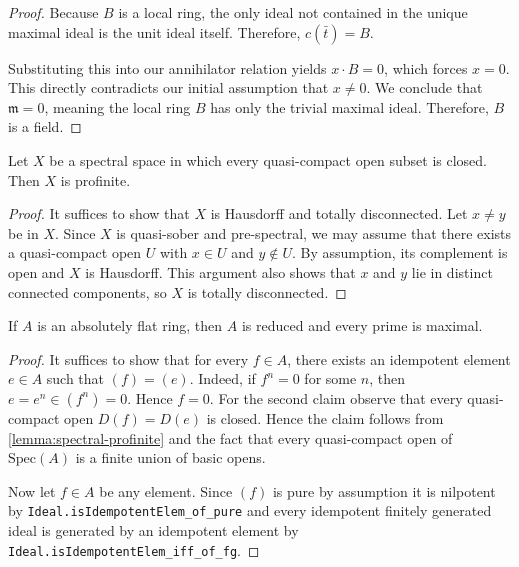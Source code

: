 \begin{proof}
    Because $B$ is a local ring, the only ideal not contained in the unique maximal ideal is the unit ideal itself. Therefore, $c(\bar{t}) = B$.

    Substituting this into our annihilator relation yields $x \cdot B = 0$, which forces $x = 0$. This directly contradicts our initial assumption that $x \neq 0$. We conclude that $\mathfrak{m} = 0$, meaning the local ring $B$ has only the trivial maximal ideal. Therefore, $B$ is a field.

\end{proof}



\begin{lemma}[\stacksproject{0905}]
    Let $X$ be a spectral space in which every quasi-compact open
    subset is closed. Then $X$ is profinite.
    \label{lemma:spectral-profinite}
\end{lemma}

\begin{proof}
    It suffices to show that $X$ is Hausdorff and totally disconnected.
    Let $x \neq y$ be in $X$. Since $X$ is quasi-sober and pre-spectral, we may assume
    that there exists a quasi-compact open $U$ with $x \in U$ and $y \not\in U$.
    By assumption, its complement is open and $X$ is Hausdorff. This
    argument also shows that $x$ and $y$ lie in distinct connected components, so
    $X$ is totally disconnected.
\end{proof}

\begin{lemma}[\stacksproject{092F} (2) => (3) (4)]
    \label{lem:reduced-prime-maximal-of-absolutely-flat}
    If $A$ is an absolutely flat ring, then $A$ is reduced and every prime is maximal.
    \leanok
\end{lemma}

\begin{proof}
    \leanok
    It suffices to show that for every $f \in A$, there exists an idempotent element $e \in A$ such that
    $(f) = (e)$. Indeed, if $f ^ n = 0$ for some $n$, then $e = e ^ n \in (f ^ n) = 0$. Hence $f = 0$.
    For the second claim observe that every quasi-compact open $D(f) = D(e)$ is closed. Hence the claim
    follows from \ref{lemma:spectral-profinite} and the fact that
    every quasi-compact open of $\mathrm{Spec}(A)$ is a finite union of basic opens.

    Now let $f \in A$ be any element. Since $(f)$ is pure by assumption it is nilpotent
    by \verb`Ideal.isIdempotentElem_of_pure` and every idempotent finitely generated ideal
    is generated by an idempotent element by \verb`Ideal.isIdempotentElem_iff_of_fg`.
\end{proof}


